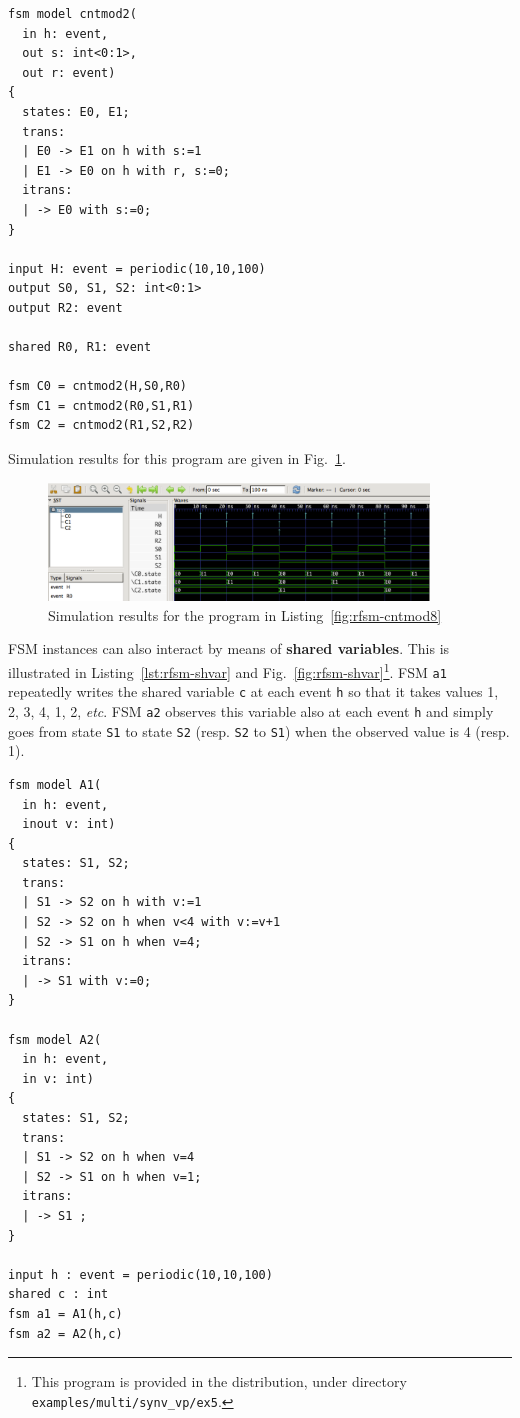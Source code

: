 \begin{lstlisting}[frame=single,language=Rfsm,
  caption={A program involving three FSM instances synchronized by a shared event},
  label={lst:rfsm-cntmod8}]
fsm model cntmod2(
  in h: event,
  out s: int<0:1>,
  out r: event)
{
  states: E0, E1;
  trans:
  | E0 -> E1 on h with s:=1
  | E1 -> E0 on h with r, s:=0;
  itrans:
  | -> E0 with s:=0;
}

input H: event = periodic(10,10,100)
output S0, S1, S2: int<0:1>
output R2: event

shared R0, R1: event

fsm C0 = cntmod2(H,S0,R0) 
fsm C1 = cntmod2(R0,S1,R1) 
fsm C2 = cntmod2(R1,S2,R2) 
\end{lstlisting}

Simulation results for this program are given in Fig.~\ref{fig:rfsm-cntmod8-vcd}.

\begin{figure}
   \includegraphics[width=0.9\textwidth]{figs/ctrmod8-chrono}
   \centering
  \caption{Simulation results for the program in Listing~\ref{fig:rfsm-cntmod8}}
  \label{fig:rfsm-cntmod8-vcd}
\end{figure}

\bigskip FSM instances can also interact by means of \textbf{shared variables}. This is illustrated
in Listing~\ref{lst:rfsm-shvar} and Fig.~\ref{fig:rfsm-shvar}\footnote{This program is provided in
  the distribution, under directory \texttt{examples/multi/synv_vp/ex5}.}. FSM \texttt{a1}
repeatedly writes the shared variable \texttt{c} at each event \texttt{h} so that it takes values 1,
2, 3, 4, 1, 2, \emph{etc}. FSM \texttt{a2} observes this variable also at each event \texttt{h} and
simply goes from state \texttt{S1} to state \texttt{S2} (resp. \texttt{S2} to \texttt{S1}) when the
observed value is 4 (resp. 1).

\begin{lstlisting}[frame=single,language=Rfsm,caption={A program involving two FSM instances and a
    shared variable},label={lst:rfsm-shvar}]
fsm model A1(
  in h: event,
  inout v: int)
{
  states: S1, S2;
  trans:
  | S1 -> S2 on h with v:=1
  | S2 -> S2 on h when v<4 with v:=v+1
  | S2 -> S1 on h when v=4;
  itrans:
  | -> S1 with v:=0;
}

fsm model A2(
  in h: event,
  in v: int)
{
  states: S1, S2;
  trans:
  | S1 -> S2 on h when v=4
  | S2 -> S1 on h when v=1;
  itrans:
  | -> S1 ;
}

input h : event = periodic(10,10,100)
shared c : int
fsm a1 = A1(h,c)
fsm a2 = A2(h,c)
\end{lstlisting}

